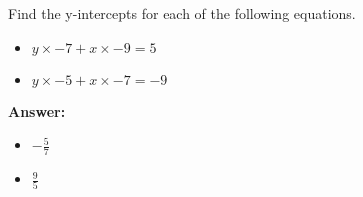  Find the y-intercepts for each of the following equations. \begin{itemize}\item \( y \times -7 + x \times -9 = 5 \)\item \( y \times -5 + x \times -7 = -9 \)\end{itemize}

        \textbf{Answer:} \begin{itemize}\item \( -\frac{5}{7} \)\item \( \frac{9}{5} \)\end{itemize}
